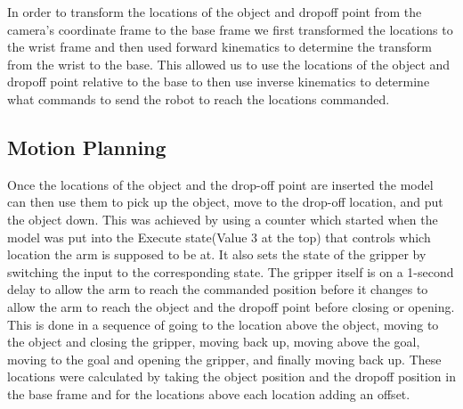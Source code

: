 In order to transform the locations of the object and dropoff point from the camera's coordinate frame to the base frame we first transformed the locations to the wrist frame and then used forward kinematics to determine the transform from the wrist to the base. This allowed us to use the locations of the object and dropoff point relative to the base to then use inverse kinematics to determine what commands to send the robot to reach the locations commanded.

\subsection{Motion Planning}

Once the locations of the object and the drop-off point are inserted the model can then use them to pick up the object, move to the drop-off location, and put the object down. This was achieved by using a counter which started when the model was put into the Execute state(Value 3 at the top) that controls which location the arm is supposed to be at. It also sets the state of the gripper by switching the input to the corresponding state. The gripper itself is on a 1-second delay to allow the arm to reach the commanded position before it changes to allow the arm to reach the object and the dropoff point before closing or opening. This is done in a sequence of going to the location above the object, moving to the object and closing the gripper, moving back up, moving above the goal, moving to the goal and opening the gripper, and finally moving back up. These locations were calculated by taking the object position and the dropoff position in the base frame and for the locations above each location adding an offset.

